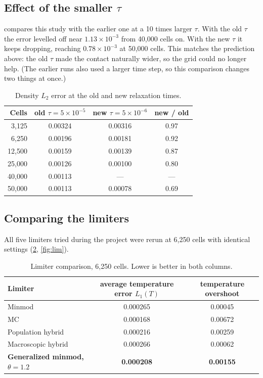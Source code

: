 \documentclass[11pt]{article}
\begin{document}
\subsection{Effect of the smaller $\tau$}
 compares this study with the earlier one at a 10 times larger $\tau$.
With the old $\tau$ the error levelled off near $1.13\times10^{-3}$ from 40,000 cells
on.  With the new $\tau$ it keeps dropping, reaching $0.78\times10^{-3}$ at 50,000
cells.  This matches the prediction above: the old $\tau$ made the contact
naturally wider, so the grid could no longer help.  (The earlier runs also used a
larger time step, so this comparison changes two things at once.)

\begin{table}[!htbp]
\centering
\caption{Density $L_2$ error at the old and new relaxation times.}
\label{tab:tau}
\small
\begin{tabular}{@{}rccc@{}}
\toprule
Cells & old $\tau = 5\times10^{-5}$ & new $\tau = 5\times10^{-6}$ & new / old \\
\midrule
3,125  & 0.00324 & 0.00316 & 0.97 \\
6,250  & 0.00196 & 0.00181 & 0.92 \\
12,500 & 0.00159 & 0.00139 & 0.87 \\
25,000 & 0.00126 & 0.00100 & 0.80 \\
40,000 & 0.00113 & ---     & ---  \\
50,000 & 0.00113 & 0.00078 & 0.69 \\
\bottomrule
\end{tabular}
\end{table}

\subsection{Comparing the limiters}
\label{sec:limiters_results}
All five limiters tried during the project were rerun at 6,250 cells with identical
settings (\cref{tab:lim}, \cref{fig:lim}).

\begin{table}[!htbp]
\centering
\caption{Limiter comparison, 6,250 cells.  Lower is better in both columns.}
\label{tab:lim}
\small
\begin{tabular}{@{}lcc@{}}
\toprule
Limiter & average temperature error $L_1(T)$ & temperature overshoot \\
\midrule
Minmod                     & 0.000265 & 0.00045 \\
MC                         & 0.000168 & 0.00672 \\
Population hybrid          & 0.000216 & 0.00259 \\
Macroscopic hybrid         & 0.000266 & 0.00062 \\
\textbf{Generalized minmod, $\theta = 1.2$} & \textbf{0.000208} & \textbf{0.00155} \\
\bottomrule
\end{tabular}
\end{table}
\end{document}
